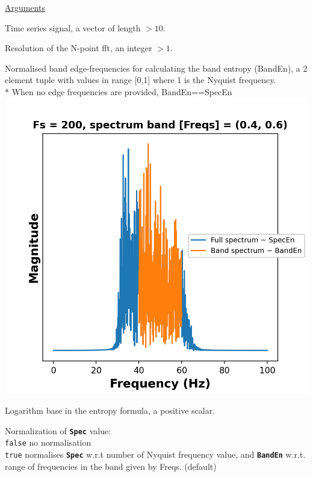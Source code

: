 \documentclass[12pt, a4paper, titlepage, openany]{book}
\begin{document}
\noindent \ul{Arguments}
\begin{description}[labelsep=1cm, labelwidth=2cm, nosep, style=multiline,leftmargin=3cm]\footnotesize
\item[\texttt{Sig}]		Time series signal, a vector of length $> 10$.
\item[\texttt{N}]		Resolution of the N-point fft, an integer $> 1$.
\item[\texttt{Freqs}]	Normalised band edge-frequencies for calculating the band entropy (BandEn), a 2 element tuple with values in range [0,1] where 1 is the Nyquist frequency. \\
		* When no edge frequencies are provided, BandEn==SpecEn \\
		\includegraphics[scale=.55]{Spec1.png}
\item[\texttt{Logx}]	Logarithm base in the entropy formula, a positive scalar.
\item[\texttt{Norm}]	Normalization of \texttt{\textbf{Spec}} value:\\
		  \texttt{false} \hspace{10pt} no normalisation \\
		  \texttt{true} \hspace{15pt}  normalises \texttt{\textbf{Spec}} w.r.t number of Nyquist frequency value, and \texttt{\textbf{BandEn}} w.r.t. range of frequencies in the band given by Freqs. (default)
\end{description}
\end{document}
